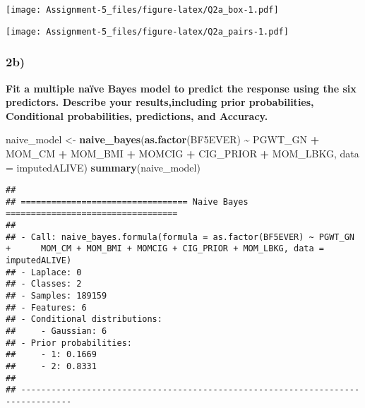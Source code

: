 \documentclass[
]{article}
\newenvironment{Shaded}{\begin{snugshade}}{\end{snugshade}}
\newcommand{\AttributeTok}[1]{\textcolor[rgb]{0.13,0.29,0.53}{#1}}
\newcommand{\FunctionTok}[1]{\textcolor[rgb]{0.13,0.29,0.53}{\textbf{#1}}}
\newcommand{\NormalTok}[1]{#1}
\newcommand{\OtherTok}[1]{\textcolor[rgb]{0.56,0.35,0.01}{#1}}
\newcommand{\SpecialCharTok}[1]{\textcolor[rgb]{0.81,0.36,0.00}{\textbf{#1}}}
\newcommand{\StringTok}[1]{\textcolor[rgb]{0.31,0.60,0.02}{#1}}
\begin{document}
\texttt{[image: Assignment-5\_files/figure-latex/Q2a\_box-1.pdf]}

\begin{Shaded}
\end{Shaded}

\texttt{[image: Assignment-5\_files/figure-latex/Q2a\_pairs-1.pdf]}

\subsubsection{2b)}\label{b}

\textbf{Fit a multiple naïve Bayes model to predict the response using
the six predictors. Describe your results,including prior probabilities,
Conditional probabilities, predictions, and Accuracy.}

\begin{Shaded}
\begin{Highlighting}[]
\NormalTok{naive\_model }\OtherTok{\textless{}{-}} \FunctionTok{naive\_bayes}\NormalTok{(}\FunctionTok{as.factor}\NormalTok{(BF5EVER) }\SpecialCharTok{\textasciitilde{}}\NormalTok{ PGWT\_GN }\SpecialCharTok{+}\NormalTok{ MOM\_CM }\SpecialCharTok{+}\NormalTok{ MOM\_BMI }\SpecialCharTok{+}\NormalTok{ MOMCIG }\SpecialCharTok{+}\NormalTok{ CIG\_PRIOR }\SpecialCharTok{+}\NormalTok{ MOM\_LBKG, }\AttributeTok{data =}\NormalTok{ imputedALIVE)}
\FunctionTok{summary}\NormalTok{(naive\_model)}
\end{Highlighting}
\end{Shaded}

\begin{verbatim}
## 
## ================================= Naive Bayes ================================== 
##  
## - Call: naive_bayes.formula(formula = as.factor(BF5EVER) ~ PGWT_GN +      MOM_CM + MOM_BMI + MOMCIG + CIG_PRIOR + MOM_LBKG, data = imputedALIVE) 
## - Laplace: 0 
## - Classes: 2 
## - Samples: 189159 
## - Features: 6 
## - Conditional distributions: 
##     - Gaussian: 6
## - Prior probabilities: 
##     - 1: 0.1669
##     - 2: 0.8331
## 
## --------------------------------------------------------------------------------
\end{verbatim}
\end{document}
